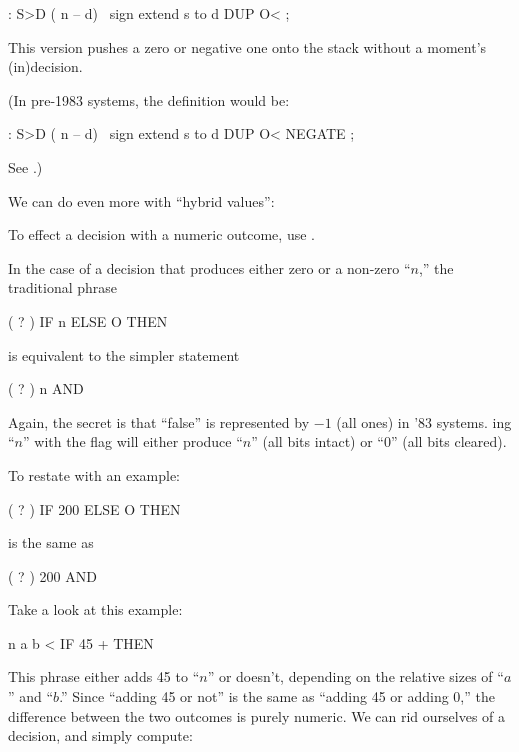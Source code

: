 \begin{Code}
: S>D  ( n -- d)  \ sign extend s to d
     DUP  O< ;
\end{Code}
This version pushes a zero or negative one onto the stack without a
moment's (in)decision.

\medbreak
(In pre-1983 systems, the definition would be:

\begin{Code}
: S>D  ( n -- d)  \ sign extend s to d
     DUP  O< NEGATE ;
\end{Code}
See .)%
\medbreak

%
We can do even more with ``hybrid values'':
%
\begin{tip}
To effect a decision with a numeric outcome, use .
\end{tip}
In the case of a decision that produces either zero or a non-zero ``$n$,''
the traditional phrase

\begin{Code}
( ? ) IF  n  ELSE  O  THEN
\end{Code}
is equivalent to the simpler statement

\begin{Code}
( ? )  n AND
\end{Code}
Again, the secret is that ``false'' is represented by $-1$ (all ones) in
'83 \Forth{} systems. ing ``$n$'' with the flag will either
produce ``$n$'' (all bits intact) or ``$0$'' (all bits cleared).

To restate with an example:

\begin{Code}
( ? )  IF  200  ELSE  O  THEN
\end{Code}
is the same as

\begin{Code}
( ? )  200 AND
\end{Code}
Take a look at this example:

\begin{Code}
n  a b <  IF  45 +  THEN
\end{Code}
This phrase either adds 45 to ``$n$'' or doesn't, depending on the
relative sizes of ``$a$'' and ``$b$.'' Since ``adding 45 or not'' is the
same as ``adding 45 or adding 0,'' the difference between the two outcomes
is purely numeric.  We can rid ourselves of a decision, and simply
compute:


